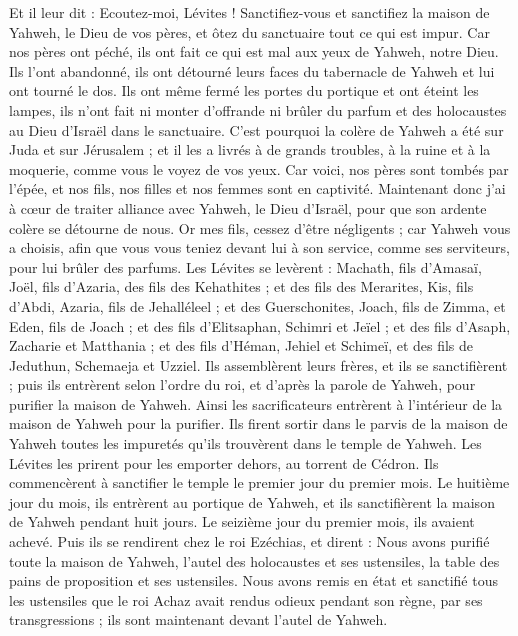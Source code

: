 \begin{multicols}{2}
Et il leur dit : Ecoutez-moi, Lévites ! Sanctifiez-vous et sanctifiez la maison de Yahweh, le Dieu de vos pères, et ôtez du sanctuaire tout ce qui est impur.
Car nos pères ont péché,  ils ont fait ce qui est mal aux yeux de Yahweh, notre Dieu. Ils l'ont abandonné, ils ont détourné leurs faces du tabernacle de Yahweh et lui ont tourné le dos.
Ils ont même fermé les portes du portique et ont éteint les lampes, ils n'ont fait ni monter d’offrande ni brûler du parfum et des holocaustes au Dieu d'Israël dans le sanctuaire.
C'est pourquoi la colère de Yahweh a été sur Juda et sur Jérusalem ; et il les a livrés à de grands troubles, à la ruine et à la moquerie, comme vous le voyez de vos yeux.
Car voici, nos pères sont tombés par l'épée, et nos fils, nos filles et nos femmes sont en captivité.
Maintenant donc j'ai à cœur de traiter alliance avec Yahweh, le Dieu d'Israël, pour que son ardente colère se détourne de nous.
Or mes fils, cessez d'être négligents ; car Yahweh vous a choisis, afin que vous vous teniez devant lui à son service, comme ses serviteurs, pour lui brûler des parfums.
Les Lévites se levèrent : Machath, fils d'Amasaï, Joël, fils d'Azaria, des fils des Kehathites ; et des fils des Merarites, Kis, fils d'Abdi, Azaria, fils de Jehalléleel ; et des Guerschonites, Joach, fils de Zimma, et Eden, fils de Joach ;
et des fils d'Elitsaphan, Schimri et Jeïel ; et des fils d'Asaph, Zacharie et Matthania ;
et des fils d'Héman, Jehiel et Schimeï, et des fils de Jeduthun, Schemaeja et Uzziel.
Ils assemblèrent leurs frères, et ils se sanctifièrent ; puis ils entrèrent selon l’ordre du roi, et d’après la parole de Yahweh, pour purifier la maison de Yahweh.
Ainsi les sacrificateurs entrèrent à l'intérieur de la maison de Yahweh pour la purifier. Ils firent sortir dans le parvis de la maison de Yahweh toutes les impuretés qu'ils trouvèrent dans le temple de Yahweh. Les Lévites les prirent pour les emporter dehors, au torrent de Cédron.
Ils commencèrent à sanctifier le temple le premier jour du premier mois. Le huitième jour du mois, ils entrèrent au portique de Yahweh, et ils sanctifièrent la maison de Yahweh pendant huit jours. Le seizième jour du premier mois, ils avaient achevé.
Puis ils se rendirent chez le roi Ezéchias, et dirent : Nous avons purifié toute la maison de Yahweh, l'autel des holocaustes et ses ustensiles, la table des pains de proposition et ses ustensiles.
Nous avons remis en état et sanctifié tous les ustensiles que le roi Achaz avait rendus odieux pendant son règne, par ses transgressions ; ils sont maintenant devant l'autel de Yahweh.

\end{multicols}
